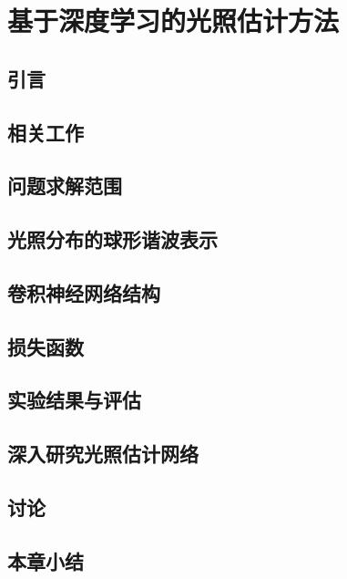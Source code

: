 \chapter{基于深度学习的光照估计方法}
\section{引言}
\section{相关工作}
\section{问题求解范围}
\section{光照分布的球形谐波表示}
\section{卷积神经网络结构}
\section{损失函数}
\section{实验结果与评估}
\section{深入研究光照估计网络}
\section{讨论}
\section{本章小结}
